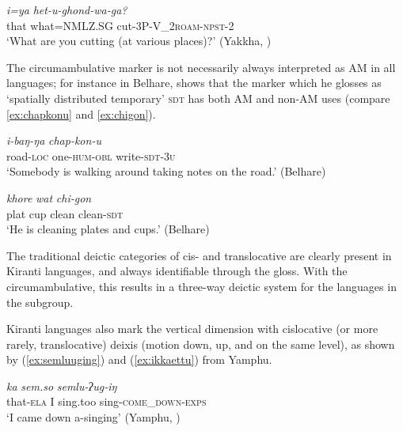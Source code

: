 \documentclass[oneside,a4paper,11pt]{article}
\newcommand{\ipa}[1]{{\phon\textit{#1}}}
\newcommand{\sens}[1]{‘#1’}
\newcommand{\rouge}[1]{{\color{red}#1}}
\begin{document}
  \begin{exe}
\ex \label{ex:hetughongwaga}
 \gll  \ipa{ŋkha}	\ipa{i=ya}	\ipa{het-u-\rouge{ghond}-wa-ga?} \\
that what=NMLZ.SG cut-3P-\rouge{V_2\textsc{roam}}-\textsc{npst}-2  \\
\glt \sens{What are you cutting (at various places)?} (Yakkha, \citealt[326]{schackow15yakkha})
\end{exe}
 
The circumambulative marker is not necessarily always interpreted as AM in all languages; for instance in Belhare, \citet[164]{bickel96aspect} shows that the marker which he glosses as `spatially distributed temporary' \textsc{sdt}  has both AM and non-AM uses (compare \ref{ex:chapkonu} and \ref{ex:chigon}). 
 
 \begin{exe}
\ex \label{ex:chapkonu}  
\gll \ipa{rot-de} \ipa{i-baŋ-ŋa} \ipa{chap-\rouge{kon}-u}  \\
road-\textsc{loc} one-\textsc{hum}-\textsc{obl} write-\textsc{\rouge{sdt}}-\textsc{3u} \\
\glt \sens{Somebody is walking around taking notes on the road.}  (Belhare)
\end{exe}

 \begin{exe}
\ex \label{ex:chigon}
\gll \ipa{thali} \ipa{khore} \ipa{wat} \ipa{chi-gon}    \\
plat cup clean clean-\textsc{sdt} \\
\glt \sens{He is cleaning plates and cups.} (Belhare)
\end{exe}


The traditional deictic categories of cis- and translocative are clearly present in Kiranti languages, and always identifiable through the gloss.  With the circumambulative, this results in a three-way deictic system for the languages in the subgroup.

Kiranti languages also mark the vertical dimension with cislocative (or more rarely, translocative) deixis (motion down, up, and on the same level), as shown by (\ref{ex:semluuging}) and (\ref{ex:ikkaettu}) from Yamphu.
 
\begin{exe}
\ex \label{ex:semluuging}
 \gll \ipa{mo.ba}	\ipa{ka}	\ipa{sem.so}	\ipa{semlu-\rouge{ʔug}-iŋ} \\
that-\textsc{ela} I sing.too sing-\textsc{\rouge{come\_down}}-\textsc{exps} \\
\glt \sens{I came down a-singing} (Yamphu, \citealt[143]{rutgers98yamphu})
\end{exe}
\end{document}
